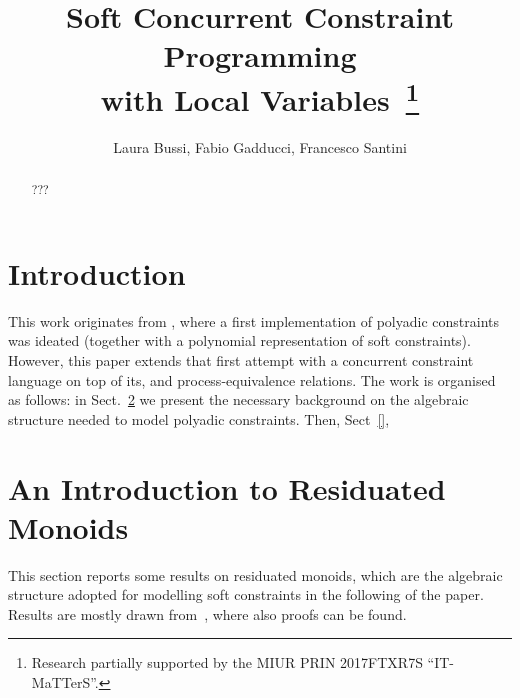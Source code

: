 \documentclass{llncs}
\begin{document}
\title{Soft Concurrent Constraint Programming\\ with Local Variables~\thanks{Research 
partially supported by the MIUR PRIN 2017FTXR7S ``IT-MaTTerS''.}}


\author{Laura Bussi, Fabio Gadducci, 
Francesco Santini
} 
	

\maketitle

\begin{abstract}
???
\end{abstract}


\section{Introduction}\label{sec:intro}
This work originates from \cite{festcatuscia}, where a first implementation of polyadic constraints was ideated (together with a polynomial representation of soft constraints). However, this paper extends that first attempt with a concurrent constraint language on top of its, and process-equivalence relations.
The work is organised as  follows: in Sect.~\ref{sec:bg} we present the necessary background on the algebraic structure needed to model polyadic constraints. Then, Sect~\ref{}, 

\section{An Introduction to Residuated Monoids}\label{sec:bg}

This section reports some results on residuated monoids,
which are the algebraic structure adopted for modelling
soft constraints in the following of the paper.
Results are mostly drawn from~\cite{jlamp17}, where also proofs can be found.
\end{document}

